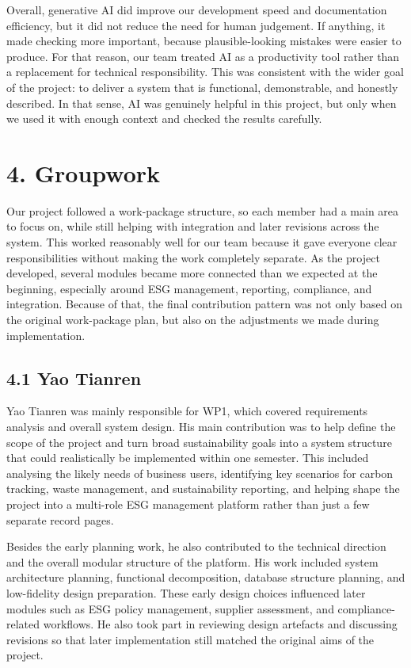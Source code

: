 \documentclass[10pt,a4paper]{article}
\begin{document}
Overall, generative AI did improve our development speed and documentation efficiency, but it did not reduce the need for human judgement. If anything, it made checking more important, because plausible-looking mistakes were easier to produce. For that reason, our team treated AI as a productivity tool rather than a replacement for technical responsibility. This was consistent with the wider goal of the project: to deliver a system that is functional, demonstrable, and honestly described. In that sense, AI was genuinely helpful in this project, but only when we used it with enough context and checked the results carefully.

\section*{4. Groupwork}
Our project followed a work-package structure, so each member had a main area to focus on, while still helping with integration and later revisions across the system. This worked reasonably well for our team because it gave everyone clear responsibilities without making the work completely separate. As the project developed, several modules became more connected than we expected at the beginning, especially around ESG management, reporting, compliance, and integration. Because of that, the final contribution pattern was not only based on the original work-package plan, but also on the adjustments we made during implementation.

\subsection*{4.1 Yao Tianren}
Yao Tianren was mainly responsible for WP1, which covered requirements analysis and overall system design. His main contribution was to help define the scope of the project and turn broad sustainability goals into a system structure that could realistically be implemented within one semester. This included analysing the likely needs of business users, identifying key scenarios for carbon tracking, waste management, and sustainability reporting, and helping shape the project into a multi-role ESG management platform rather than just a few separate record pages.

Besides the early planning work, he also contributed to the technical direction and the overall modular structure of the platform. His work included system architecture planning, functional decomposition, database structure planning, and low-fidelity design preparation. These early design choices influenced later modules such as ESG policy management, supplier assessment, and compliance-related workflows. He also took part in reviewing design artefacts and discussing revisions so that later implementation still matched the original aims of the project.
\end{document}
